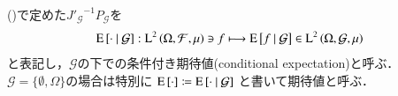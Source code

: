 	\begin{screen}
		\begin{dfn}
			()で定めた${J'_{\mathcal{G}}}^{-1} P_{\mathcal{G}}$を
			\begin{align}
				\operatorname{E} \left[ \cdot \ \middle|\ \mathcal{G} \right]:\operatorname{L}^{2} \left(\Omega, \mathcal{F},\mu\right) \ni f \longmapsto \operatorname{E} \left[ f \ \middle|\ \mathcal{G} \right] \in \operatorname{L}^{2} \left(\Omega, \mathcal{G},\mu\right)
				\label{eq:dfn_L2_conditional_expectation}
			\end{align}
			と表記し，$\mathcal{G}$の下での条件付き期待値(conditional expectation)と呼ぶ．
			$\mathcal{G} = \{\emptyset, \Omega\}$の場合は特別に
			$\operatorname{E} \left[ \cdot \right] \coloneqq \operatorname{E} \left[ \cdot \ \middle|\ \mathcal{G} \right]$
			と書いて期待値と呼ぶ．
		\end{dfn}
	\end{screen}
	
